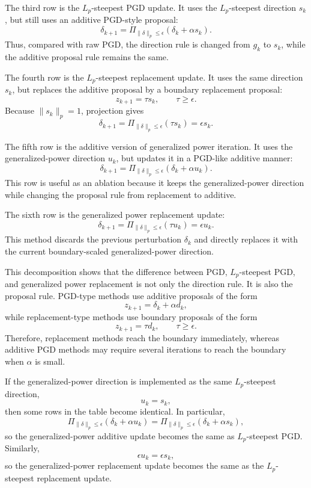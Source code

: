 \documentclass{article}
\begin{document}
The third row is the \(L_p\)-steepest PGD update. It uses the \(L_p\)-steepest direction \(s_k\), but still uses an additive PGD-style proposal:
\[
\delta_{k+1}
=
\Pi_{\|\delta\|_p\le\epsilon}
(\delta_k+\alpha s_k).
\]
Thus, compared with raw PGD, the direction rule is changed from \(g_k\) to \(s_k\), while the additive proposal rule remains the same.

The fourth row is the \(L_p\)-steepest replacement update. It uses the same direction \(s_k\), but replaces the additive proposal by a boundary replacement proposal:
\[
z_{k+1}
=
\tau s_k,
\qquad
\tau\ge\epsilon.
\]
Because \(\|s_k\|_p=1\), projection gives
\[
\delta_{k+1}
=
\Pi_{\|\delta\|_p\le\epsilon}(\tau s_k)
=
\epsilon s_k.
\]

The fifth row is the additive version of generalized power iteration. It uses the generalized-power direction \(u_k\), but updates it in a PGD-like additive manner:
\[
\delta_{k+1}
=
\Pi_{\|\delta\|_p\le\epsilon}
(\delta_k+\alpha u_k).
\]
This row is useful as an ablation because it keeps the generalized-power direction while changing the proposal rule from replacement to additive.

The sixth row is the generalized power replacement update:
\[
\delta_{k+1}
=
\Pi_{\|\delta\|_p\le\epsilon}
(\tau u_k)
=
\epsilon u_k.
\]
This method discards the previous perturbation \(\delta_k\) and directly replaces it with the current boundary-scaled generalized-power direction.

This decomposition shows that the difference between PGD, \(L_p\)-steepest PGD, and generalized power replacement is not only the direction rule. It is also the proposal rule. PGD-type methods use additive proposals of the form
\[
z_{k+1}
=
\delta_k+\alpha d_k,
\]
while replacement-type methods use boundary proposals of the form
\[
z_{k+1}
=
\tau d_k,
\qquad
\tau\ge\epsilon.
\]
Therefore, replacement methods reach the boundary immediately, whereas additive PGD methods may require several iterations to reach the boundary when \(\alpha\) is small.

If the generalized-power direction is implemented as the same \(L_p\)-steepest direction,
\[
u_k=s_k,
\]
then some rows in the table become identical. In particular,
\[
\Pi_{\|\delta\|_p\le\epsilon}
(\delta_k+\alpha u_k)
=
\Pi_{\|\delta\|_p\le\epsilon}
(\delta_k+\alpha s_k),
\]
so the generalized-power additive update becomes the same as \(L_p\)-steepest PGD. Similarly,
\[
\epsilon u_k
=
\epsilon s_k,
\]
so the generalized-power replacement update becomes the same as the \(L_p\)-steepest replacement update.
\end{document}
